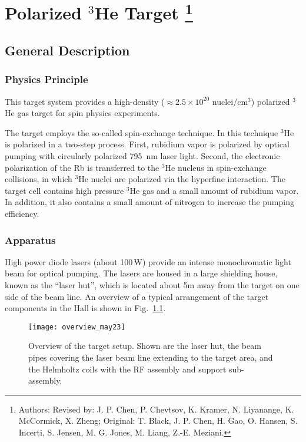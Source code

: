 \chapter[Polarized $^3$He Target]{Polarized $^3$He Target
\footnote{Authors: Revised by: J. P. Chen, P. Chevtsov, K. Kramer, 
N. Liyanange, K. McCormick, X. Zheng; Original: T. Black, J. P. Chen, H. Gao, 
O. Hansen, S. Incerti, S. Jensen, M. G. Jones, M. Liang, Z.-E. Meziani.
}
}

\section{General Description}
\label{sec:general}
\subsection{Physics Principle}

This target system provides a high-density 
($\approx 2.5\times 10^{20}$ nuclei/cm$^3$)
polarized $^3$He gas target for spin physics experiments. 

The target employs the so-called spin-exchange technique.
In this technique $^3$He is polarized in a two-step process.
First, rubidium vapor is polarized by optical pumping with
circularly polarized 795~nm laser light. Second, the electronic polarization
of the Rb is transferred to the $^3$He nucleus in spin-exchange
collisions, in which $^3$He nuclei are polarized via the hyperfine interaction.
The target cell contains high pressure $^3$He gas and a small amount of
rubidium vapor. In addition, it
also contains a small amount of nitrogen to increase the
pumping efficiency.

\subsection{Apparatus}

High power diode lasers (about 100\,W) provide an intense monochromatic
light beam for optical pumping.  The lasers are housed in a large
shielding house, known as the ``laser hut'', which is located about 5m
away from the target on one side of the beam line.  An overview of a
typical arrangement of the target components in the Hall is shown in
Fig.~\ref{fig:overview}.

\begin{figure}[p]
\begin{center}
\centerline{\texttt{[image: overview\_may23]}}
\end{center}
\caption[Overview of the polarized $^3$He target setup]%
{Overview of the target setup. Shown are the laser hut, the
beam pipes covering the laser beam line extending to the target area,
and the Helmholtz coils with the RF assembly and support sub-assembly. }
\label{fig:overview}
\end{figure}

